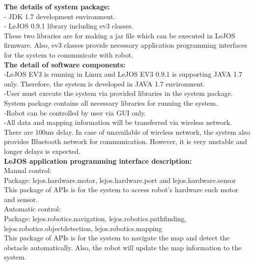 \documentclass[10pt,a4paper,titlepage]{article}
\begin{document}
\textbf{The details of system package:}\\

-	JDK 1.7 development environment.\\
-	LeJOS 0.9.1 library including ev3 classes.\\

These two libraries are for making a jar file which can be executed in LeJOS firmware. Also, ev3 classes provide necessary application programming interfaces for the system to communicate with robot.\\

\textbf{The detail of software components:}\\

-LeJOS EV3 is running in Linux and LeJOS EV3 0.9.1 is supporting JAVA 1.7 only.     
Therefore, the system is developed in JAVA 1.7 environment.\\

-User must execute the system via provided libraries in the system package. System package contains all necessary libraries for running the system.\\

-Robot can be controlled by user via GUI only.\\

-All data and mapping information will be transferred via wireless network. There are 100ms delay. In case of unavailable of wireless network, the system also provides Bluetooth network for communication. However, it is very unstable and longer delays is expected.\\




\textbf{LeJOS application programming interface description:}\\

Manual control:\\

Package: lejos.hardware.motor, lejos.hardware.port and lejos.hardware.sensor\\

This package of APIs is for the system to access robot’s hardware such motor and sensor.\\

Automatic control:\\

Package: lejos.robotics.navigation, lejos.robotics.pathfinding, lejos.robotics.objectdetection, lejos.robotics.mapping\\

This package of APIs is for the system to navigate the map and detect the obstacle automatically. Also, the robot will update the map information to the system.\\
\end{document}
